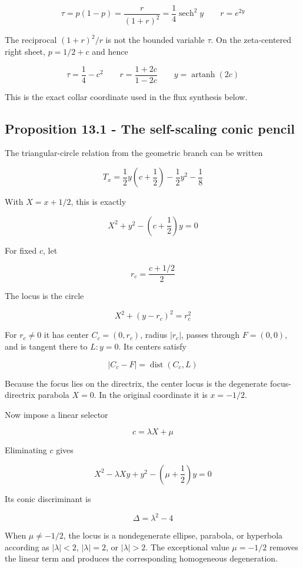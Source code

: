 \documentclass[
  11pt,
]{book}
\begin{document}
\[
\boxed{
\tau=p(1-p)=\frac{r}{(1+r)^2}
=\frac14\operatorname{sech}^2 y
\qquad r=e^{2y}
}
\]

The reciprocal \((1+r)^2/r\) is not the bounded variable \(\tau\). On
the zeta-centered right sheet, \(p=1/2+c\) and hence

\[
\boxed{
\tau=\frac14-c^2
\qquad
r=\frac{1+2c}{1-2c}
\qquad
y=\operatorname{artanh}(2c)
}
\]

This is the exact collar coordinate used in the flux synthesis below.

\subsection{Proposition 13.1 - The self-scaling conic
pencil}\label{proposition-13.1---the-self-scaling-conic-pencil}

The triangular-circle relation from the geometric branch can be written

\[
T_x
=\frac12y\left(c+\frac12\right)
-\frac12y^2-\frac18
\]

With \(X=x+1/2\), this is exactly

\[
\boxed{
X^2+y^2-\left(c+\frac12\right)y=0
}
\]

For fixed \(c\), let

\[
r_c=\frac{c+1/2}{2}
\]

The locus is the circle

\[
X^2+(y-r_c)^2=r_c^2
\]

For \(r_c\ne0\) it has center \(C_c=(0,r_c)\), radius \(|r_c|\), passes
through \(F=(0,0)\), and is tangent there to \(L:y=0\). Its centers
satisfy

\[
|C_c-F|=\operatorname{dist}(C_c,L)
\]

Because the focus lies on the directrix, the center locus is the
degenerate focus-directrix parabola \(X=0\). In the original coordinate
it is \(x=-1/2\).

Now impose a linear selector

\[
c=\lambda X+\mu
\]

Eliminating \(c\) gives

\[
\boxed{
X^2-\lambda Xy+y^2-\left(\mu+\frac12\right)y=0
}
\]

Its conic discriminant is

\[
\Delta=\lambda^2-4
\]

When \(\mu\ne-1/2\), the locus is a nondegenerate ellipse, parabola, or
hyperbola according as \(|\lambda|<2\), \(|\lambda|=2\), or
\(|\lambda|>2\). The exceptional value \(\mu=-1/2\) removes the linear
term and produces the corresponding homogeneous degeneration.
\end{document}
